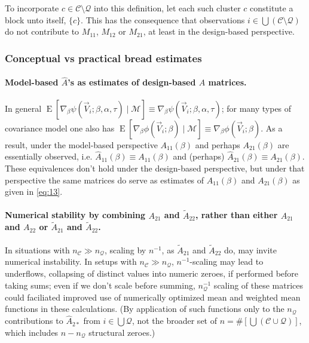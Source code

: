 \documentclass{article}
\newcommand{\EE}{\operatorname{E}}
\begin{document}
To incorporate $c\in \mathcal{C}\setminus\mathcal{Q}$ into this
definition, let each such cluster $c$ constitute a block unto itself,
$\{c\}$. This has the consequence that observations $i
\in \bigcup\left(\mathcal{C}\setminus\mathcal{Q}\right)$ do not
contribute to $M_{11}$, $M_{12}$ or $M_{21}$, at least in the
design-based perspective.

  \subsubsection{Conceptual vs practical bread estimates} \label{sec:conc-vs-pract}
  \paragraph{Model-based $\hat{A}$'s as estimates of design-based $A$ matrices.}%
In general $\EE
[\nabla_{\beta}\psi(\vec{V}_{i};  \beta, \alpha,\tau ) \mid \mathcal{M}] \equiv
\nabla_{\beta}\psi(\vec{V}_{i};  \beta, \alpha, \tau )$; for many types of
covariance model one also has $\EE
[\nabla_{\beta}\phi(\vec{V}_{i};  \beta ) \mid \mathcal{M}] \equiv
\nabla_{\beta}\phi(\vec{V}_{i};  \beta )$. As a result, under the
model-based perspective
$A_{11}(\beta)$ and perhaps $A_{21}(\beta)$ are essentially observed,
i.e.  $\hat{A}_{11}(\beta) \equiv A_{11}(\beta)$ and (perhaps)
$\hat{A}_{21}(\beta) \equiv A_{21}(\beta)$.   These equivalences don't
hold under the design-based perspective, but under that perspective
the same matrices do serve as estimates of $A_{11}(\beta)$ and
$A_{21}(\beta)$ as given in \eqref{eq:13}. 

\paragraph{Numerical stability by combining ${A}_{21}$ and $\tilde{A}_{22}$, rather than either
  ${A}_{21}$ and ${A}_{22}$ or $\tilde{A}_{21}$ and $\tilde{A}_{22}$.}
  In situations with $n_{\mathcal{C}} \gg n_{\mathcal{Q}}$, scaling
  by $n^{-1}$, as $\tilde{A}_{21}$ and $\tilde{A}_{22}$ do, may
  invite numerical instability. In setups with $n_{\mathcal{C}} \gg
  n_{\mathcal{Q}}$, $n^{-1}$-scaling may lead to underflows,
  collapsing of distinct values into numeric zeroes, if performed
  before taking sums; even if we don't scale before summing,
  $n_{\mathcal{Q}}^{-1}$ scaling of these matrices could faciliated improved
  use of numerically optimized mean and weighted mean functions in
  these calculations.  (By application of such functions only to the
  $n_{\mathcal{Q}}$ contributions to $\hat{A}_{2*}$  from $i \in \bigcup \mathcal{Q}$, not the broader set of $n = \#\left[\bigcup (\mathcal{C}\cup
    \mathcal{Q}) \right]$, which includes $n - n_{\mathcal{Q}}$ structural
  zeroes.)
\end{document}

